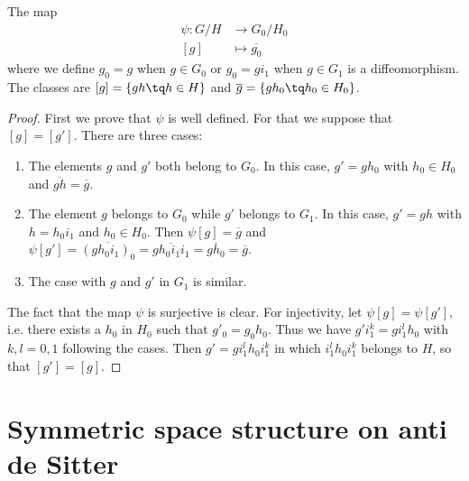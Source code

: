 \begin{proposition} \label{PropGHconn}
The map
\begin{equation}
\begin{aligned}
 \psi\colon G/H&\to G_0/H_0 \\ 
[g]&\mapsto \overline{ g_0 } 
\end{aligned}
\end{equation}
where we define $g_0=g$ when $g\in G_0$ or $g_0=gi_1$ when $g\in G_1$ is a diffeomorphism. The classes are $[g]=\{ gh\tq h\in H \}$ and $\overline{ g }=\{ gh_0\tq h_0\in H_0 \}$.
\end{proposition}

\begin{proof}
First we prove that $\psi$ is well defined. For that we suppose that $[g]=[g']$. There are three cases:
\begin{enumerate}
\item The elements $g$ and $g'$ both belong to $G_0$. In this case, $g'=gh_0$ with $h_0\in H_0$ and $\overline{ gh }=\overline{ g }$.
\item The element $g$ belongs to $G_0$ while $g'$ belongs to $G_1$. In this case, $g'=gh$ with $h=h_0i_1$ and $h_0\in H_0$. Then $\psi[g]=\overline{ g }$ and $\psi[g']= \overline{ (gh_0i_1)_0 }=\overline{ gh_0i_1i_1 }=\overline{ gh_0 }=\overline{ g } $.
\item The case with $g$ and $g'$ in $G_1$ is similar.
\end{enumerate}

The fact that the map $\psi$ is surjective is clear. For injectivity, let $\psi[g]=\psi[g']$, i.e. there exists a $h_0$ in $H_0$ such that $g'_0=g_0h_0$. Thus we have $g'i_1^k=gi_1^lh_0$ with $k,l=0,1$ following the cases. Then $g'=gi_1^lh_0i_1^k$ in which $i_1^lh_0i_1^k$ belongs to $H$, so that $[g']=[g]$.

\end{proof}


\section{Symmetric space structure on anti de Sitter}\label{SecSymeStructAdS}


